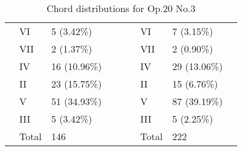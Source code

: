 \begin{table}[tbp]
{\begin{tabular}{|l|l|l|l|l|l|l|l|l|}
 & VI & 5 (3.42\%) &  &  &  & VI & 7 (3.15\%) &  \\ \cline{2-3} \cline{7-8}
 & VII & 2 (1.37\%) &  &  &  & VII & 2 (0.90\%) &  \\ \cline{2-3} \cline{7-8}
 & IV & 16 (10.96\%) &  &  &  & IV & 29 (13.06\%) &  \\ \cline{2-3} \cline{7-8}
 & II & 23 (15.75\%) &  &  &  & II & 15 (6.76\%) &  \\ \cline{2-3} \cline{7-8}
 & V & 51 (34.93\%) &  &  &  & V & 87 (39.19\%) &  \\ \cline{2-3} \cline{7-8}
 & III & 5 (3.42\%) &  &  &  & III & 5 (2.25\%) &  \\ \cline{2-3} \cline{7-8}
 & Total & 146 &  &  &  & Total & 222 &  \\ \cline{1-4} \cline{6-9}
\end{tabular}
}
\caption{Chord distributions for Op.20 No.3}
\label{table:chords_op20n3}
\end{table}

